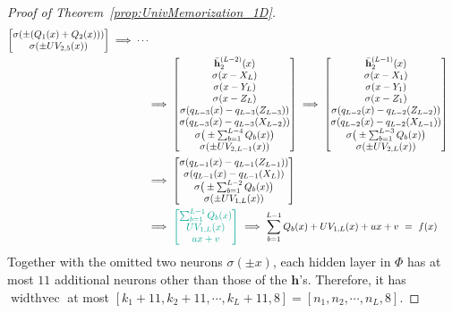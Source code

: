 \documentclass{article}
\numberwithin{equation}{section}
\theoremstyle{definition}
\begin{document}
\begin{proof}[{Proof of Theorem~\ref{prop:UnivMemorization_1D}}]
\begin{align*}
\begin{bmatrix}
        \sigma( \pm (Q_1(x)+Q_2(x)) )  \\ 
        \sigma( \pm UV_{2,5}(x) ) 
    \end{bmatrix}
    \ \Longrightarrow \
    \cdots
    \\
    \ &\Longrightarrow \
    \begin{bmatrix}
        \Bar{\mathbf{h}}_2^{(L-2)} (x)  \\
        \sigma(x - X_{L})  \\  
        \sigma(x - Y_{L})  \\
        \sigma(x - Z_{L})  \\
        \sigma( q_{L-3}(x) - q_{L-3}(Z_{L-3}) )  \\
        \sigma( q_{L-3}(x) - q_{L-3}(X_{L-2}) )  \\
        \sigma\big( \pm \sum_{b=1}^{L-4} Q_b(x) \big)  \\ 
        \sigma( \pm UV_{2,L-1}(x) ) 
    \end{bmatrix}
    \ \Longrightarrow \
    \begin{bmatrix}
        \Bar{\mathbf{h}}_2^{(L-1)} (x)  \\
        \sigma(x - X_{1})  \\  
        \sigma(x - Y_{1})  \\
        \sigma(x - Z_{1})  \\
        \sigma( q_{L-2}(x) - q_{L-2}(Z_{L-2}) )  \\
        \sigma( q_{L-2}(x) - q_{L-2}(X_{L-1}) )  \\
        \sigma\big( \pm \sum_{b=1}^{L-3} Q_b(x) \big)  \\
        \sigma ( \pm UV_{2,L}(x) )
    \end{bmatrix}
    \\ 
    \ &\Longrightarrow \
    \begin{bmatrix}
        \sigma( q_{L-1}(x) - q_{L-1}(Z_{L-1}) )  \\
        \sigma( q_{L-1}(x) - q_{L-1}(X_{L}) )  \\
        \sigma\big( \pm \sum_{b=1}^{L-2} Q_b(x) \big)  \\
        \sigma ( \pm UV_{1,L}(x) )
    \end{bmatrix}
    \\
    \ &\Longrightarrow \
    {\color{persiangreen}
    \begin{bmatrix}
        \sum_{b=1}^{L-1} Q_b(x)  \\
        UV_{1,L}(x)  \\
        ux+v
    \end{bmatrix}
    }
    \ \Longrightarrow \
    \sum_{b=1}^{L-1} Q_b(x) 
    + 
    UV_{1,L}(x)
    +
    ux+v
    \ = \ 
    f(x)
\end{align*}
Together with the omitted two neurons $\sigma(\pm x)$, each hidden layer in $\Phi$ has at most $11$ additional neurons other than those of the $\mathbf{h}$'s. Therefore, it has $\operatorname{widthvec}$ at most $[k_1+11, k_2+11, \cdots, k_L+11, 8] = [n_1,n_2,\cdots,n_L,8]$. 


\end{proof}
\end{document}
